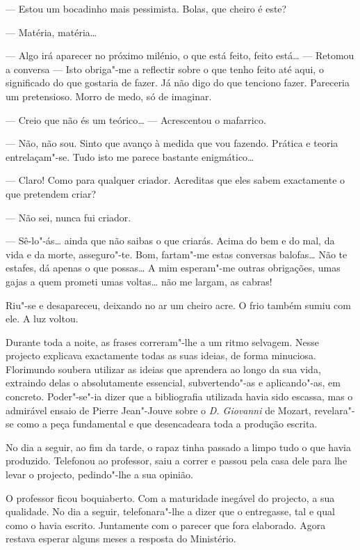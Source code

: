 --- Estou um bocadinho mais pessimista. Bolas, que cheiro é este?

--- Matéria, matéria\ldots{}

--- Algo irá aparecer no próximo milénio, o que está feito, feito está\ldots{}
---  Retomou a conversa --- Isto obriga"-me a reflectir sobre o que tenho
feito até aqui, o significado do que gostaria de fazer. Já não digo do
que tenciono fazer. Pareceria um pretensioso. Morro de medo, só de
imaginar.

--- Creio que não és um teórico\ldots{} --- Acrescentou o mafarrico.

--- Não, não sou. Sinto que avanço à medida que vou fazendo. Prática e
teoria entrelaçam"-se. Tudo isto me parece bastante enigmático\ldots{}

--- Claro! Como para qualquer criador. Acreditas que eles sabem
exactamente o que pretendem criar?

--- Não sei, nunca fui criador.

--- Sê-lo"-ás\ldots{} ainda que não saibas o que criarás. Acima do bem e do mal,
da vida e da morte, asseguro"-te. Bom, fartam"-me estas conversas
balofas\ldots{} Não te estafes, dá apenas o que possas\ldots{} A mim esperam"-me
outras obrigações, umas gajas a quem prometi umas voltas\ldots{} não me
largam, as cabras!

Riu"-se e desapareceu, deixando no ar um cheiro acre. O frio também sumiu
com ele. A luz voltou.

Durante toda a noite, as frases correram"-lhe a um ritmo selvagem. Nesse
projecto explicava exactamente todas as suas ideias, de forma minuciosa.
Florimundo soubera utilizar as ideias que aprendera ao longo da sua
vida, extraindo delas o absolutamente essencial, subvertendo"-as e
aplicando"-as, em concreto. Poder"-se"-ia dizer que a bibliografia
utilizada havia sido escassa, mas o admirável ensaio de Pierre
Jean"-Jouve sobre o \emph{D. Giovanni} de Mozart, revelara"-se como a peça
fundamental e que desencadeara toda a produção escrita.

No dia a seguir, ao fim da tarde, o rapaz tinha passado a limpo tudo o
que havia produzido. Telefonou ao professor, saiu a correr e passou pela
casa dele para lhe levar o projecto, pedindo"-lhe a sua opinião.

O professor ficou boquiaberto. Com a maturidade inegável do projecto, a
sua qualidade. No dia a seguir, telefonara"-lhe a dizer que o entregasse,
tal e qual como o havia escrito. Juntamente com o parecer que fora
elaborado. Agora restava esperar alguns meses a resposta do Ministério.

